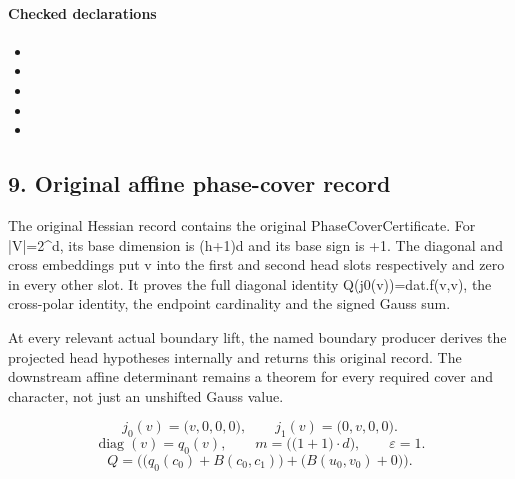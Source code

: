 \paragraph{Checked declarations}
\begin{itemize}
\item {}
\item {}
\item {}
\item {}
\item {}
\end{itemize}

\subsection*{9. Original affine phase-cover record}
The original Hessian record contains the original PhaseCoverCertificate. For |V|=2\textasciicircum{}d, its base dimension is (h+1)d and its base sign is +1. The diagonal and cross embeddings put v into the first and second head slots respectively and zero in every other slot. It proves the full diagonal identity Q(j0(v))=dat.f(v,v), the cross-polar identity, the endpoint cardinality and the signed Gauss sum.

At every relevant actual boundary lift, the named boundary producer derives the projected head hypotheses internally and returns this original record. The downstream affine determinant remains a theorem for every required cover and character, not just an unshifted Gauss value.

\[j_0(v)=\bigl(v,0,0,0\bigr),\qquad j_1(v)=\bigl(0,v,0,0\bigr).\]
\[\operatorname{diag}(v)=q_0(v),\qquad m=\bigl(\bigl(1+1\bigr)\cdot d\bigr),\qquad \varepsilon=1.\]
\[Q=\bigl(\bigl(q_0(c_0)+B(c_0,c_1)\bigr)+\bigl(B(u_{0},v_{0})+0\bigr)\bigr).\]

